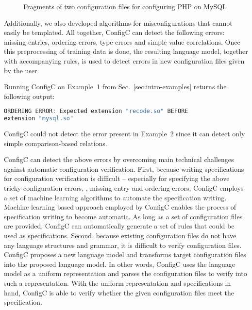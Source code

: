 \begin{figure}
	\centering
\begin{minipage}{0.9\textwidth}
\begin{parcolumns}{2}


\colplacechunks
\end{parcolumns}
\end{minipage}
	\caption{Fragments of two configuration files for configuring PHP on MySQL}
	\label{fig:twoFiles}
\end{figure}


Additionally, we also developed algorithms for 
misconfigurations that cannot easily be templated. All together, 
ConfigC can detect the following errors:
missing entries, ordering errors, type errors and
simple value correlations. Once this preprocessing of training data is 
done, the resulting language model, 
together with accompanying rules, 
is used to detect errors in new configuration files given by the user.

Running ConfigC on Example~1 from 
Sec.~\ref{sec:intro-examples} returns the following output:
\begin{lstlisting}[language=C, xleftmargin=.01\textwidth]
ORDERING ERROR: Expected extension "recode.so" BEFORE 
extension "mysql.so"
\end{lstlisting} 
ConfigC could not detect the error present in Example~2 since it can detect 
only simple comparison-based relations.

\iffalse

ConfigC can detect the above errors by overcoming 
main technical challenges against automatic configuration verification.
First, because writing specifications for configuration verification
is difficult -- especially for specifying the above
tricky configuration errors, \eg, missing entry and ordering errors,
ConfigC employs a set of machine learning algorithms to
automate the specification writing. Machine learning based approach
employed by ConfigC enables the process of specification writing to become
automatic. As long as a set of configuration files are provided,
ConfigC can automatically generate a set of rules that could be used
as specifications.
Second, because existing configuration files do not have any language
structures and grammar, it is difficult to verify configuration files.
ConfigC proposes a new language model and transforms target configuration
files into the proposed language model. In other words, ConfigC uses
the language model as a uniform representation and parses the 
configuration files to verify into such a representation.
With the uniform representation and specifications in hand,
ConfigC is able to verify whether the given configuration files
meet the specification.

